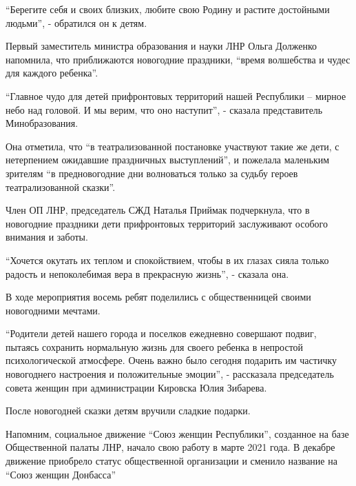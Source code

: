 \enquote{Берегите себя и своих близких, любите свою Родину и растите достойными
людьми}, - обратился он к детям.

Первый заместитель министра образования и науки ЛНР Ольга Долженко напомнила,
что приближаются новогодние праздники, \enquote{время волшебства и чудес для каждого
ребенка}.

\enquote{Главное чудо для детей прифронтовых территорий нашей Республики – мирное небо
над головой. И мы верим, что оно наступит}, - сказала представитель
Минобразования.

Она отметила, что \enquote{в театрализованной постановке участвуют такие же дети, с
нетерпением ожидавшие праздничных выступлений}, и пожелала маленьким зрителям
\enquote{в предновогодние дни волноваться только за судьбу героев театрализованной
сказки}.

Член ОП ЛНР, председатель СЖД Наталья Приймак подчеркнула, что в новогодние
праздники дети прифронтовых территорий заслуживают особого внимания и заботы.

\enquote{Хочется окутать их теплом и спокойствием, чтобы в их глазах сияла только
радость и непоколебимая вера в прекрасную жизнь}, - сказала она.

В ходе мероприятия восемь ребят поделились с общественницей своими новогодними
мечтами.

\enquote{Родители детей нашего города и поселков ежедневно совершают подвиг, пытаясь
сохранить нормальную жизнь для своего ребенка в непростой психологической
атмосфере. Очень важно было сегодня подарить им частичку новогоднего настроения
и положительные эмоции}, - рассказала председатель совета женщин при
администрации Кировска Юлия Зибарева.

После новогодней сказки детям вручили сладкие подарки.

Напомним, социальное движение \enquote{Союз женщин Республики}, созданное на базе
Общественной палаты ЛНР, начало свою работу в марте 2021 года. В декабре
движение приобрело статус общественной организации и сменило название на \enquote{Союз
женщин Донбасса}
